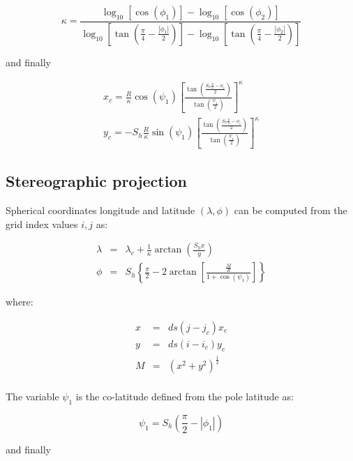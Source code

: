 \begin{equation}
  \kappa = \frac{\log_{10}\left[\cos(\phi_1)\right] - 
                 \log_{10}\left[\cos(\phi_2)\right]}
                {\log_{10}\left[\tan(\frac{\pi}{4}-\frac{|\phi_1|}{2})\right]-
                 \log_{10}\left[\tan(\frac{\pi}{4}-\frac{|\phi_2|}{2})\right]}
\end{equation}

and finally

\begin{eqnarray}
  x_c = \frac{R}{\kappa} \cos(\psi_1) \left[\frac{\tan\left(
         \frac{S_h \frac{\pi}{2}-\phi_c}{2}\right)}
         {\tan\left(\frac{\psi_1}{2}\right)} \right]^\kappa \\
  y_c = -S_h \frac{R}{\kappa} \sin(\psi_1) \left[\frac{\tan\left(
         \frac{S_h \frac{\pi}{2}-\phi_c}{2}\right)}
         {\tan\left(\frac{\psi_1}{2}\right)} \right]^\kappa
\end{eqnarray}

\subsection{Stereographic projection}

Spherical coordinates longitude and latitude $(\lambda, \phi)$ can be computed
from the grid index values $i,j$ as:

\begin{eqnarray}
  \lambda &=& \lambda_c + 
         \frac{1}{\kappa}\arctan\left(\frac{S_h x}{y}\right) \\
  \phi &=& S_h \left\{ \frac{\pi}{2} - 
              2 \arctan\left[\frac{\frac{M}{R}}{1+\cos(\psi_1)}\right]
              \right\}
\end{eqnarray}

where:

\begin{eqnarray}
  x &=& ds \left(j-j_c\right) x_c \\
  y &=& ds \left(i-i_c\right) y_c \\
  M &=& \left(x^2+y^2\right)^{\frac{1}{2}} \\
\end{eqnarray}

The variable $\psi_1$ is the co-latitude defined from the pole latitude as:

\begin{equation}
  \psi_1 = S_h \left(\frac{\pi}{2} - |\phi_1| \right)
\end{equation}

and finally

